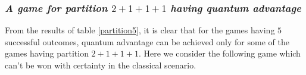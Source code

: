 \documentclass[]{svjour3}
\begin{document}
\begin{table}[htb]
	\begin{center}
		\setlength{\tabcolsep}{0.35em}
	\end{center}
	\caption{Analysis of partitions for $5$ successful outcomes} 
	\label{partition5}
\end{table}

\subsubsection{\it A game for partition $2+1+1+1$ having quantum advantage}

From the results of table \ref{partition5}, it is clear that for the games having $5$ successful outcomes, quantum advantage can be achieved only for some of the games having partition $2+1+1+1$.
Here we consider the following game which can't be won with certainty in the classical scenario.


\begin{table}[htb]
	\begin{center}
		\setlength{\tabcolsep}{0.35em}
	\end{center}
\end{table}
\end{document}
